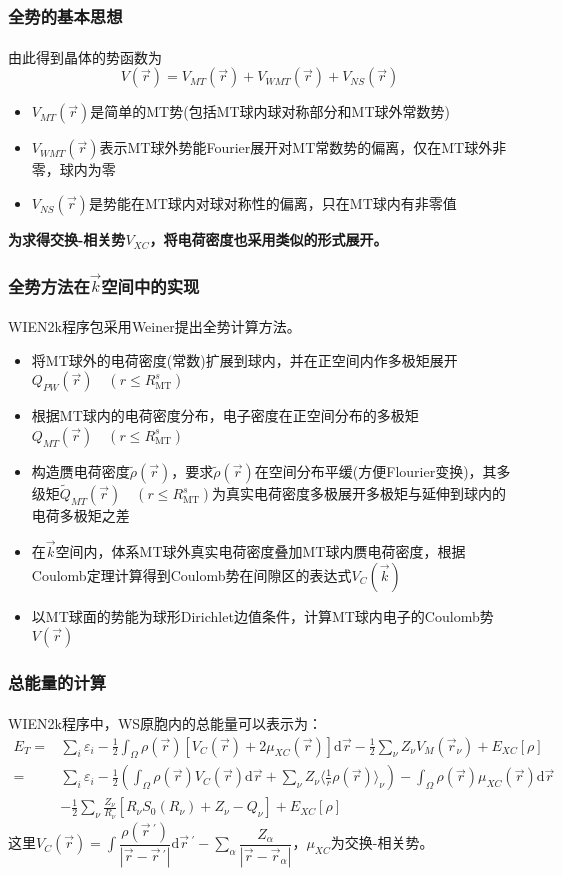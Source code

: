 \documentclass[cjk,slidestop,compress,mathserif,blue]{beamer}
\newcommand{\upcite}[1]{\hspace{0ex}\textsuperscript{\cite{#1}}} %
\begin{document}
\frame
{
\frametitle{全势的基本思想}
由此得到晶体的势函数为\upcite{Comp_Method}
$$ V(\vec r)=V_{MT}(\vec r)+V_{WMT}(\vec r)+V_{NS}(\vec r)
  \label{eq:solid-64}
$$
\begin{itemize}
	\item $V_{MT}(\vec r)$是简单的\textrm{MT}势(包括\textrm{MT}球内球对称部分和\textrm{MT}球外常数势)
	\item $V_{WMT}(\vec r)$表示\textrm{MT}球外势能\textrm{Fourier}展开对\textrm{MT}常数势的偏离，仅在\textrm{MT}球外非零，球内为零
	\item $V_{NS}(\vec r)$是势能在\textrm{MT}球内对球对称性的偏离，只在\textrm{MT}球内有非零值
\end{itemize}
\textbf{\large 为求得交换-相关势$V_{XC}$，将电荷密度也采用类似的形式展开。}
}
\frame
{
\frametitle{全势方法在$\vec k$空间中的实现}
\textrm{WIEN2k}程序包采用\textrm{Weiner}提出全势计算方法\upcite{JMP22-2433_1981}。
\begin{itemize}
	\item 将\textrm{MT}球外的电荷密度(常数)扩展到球内，并在正空间内作多极矩展开$Q_{PW}(\vec r)\quad(r\leqslant R_{\mathrm{MT}}^s)$
	\item 根据\textrm{MT}球内的电荷密度分布，电子密度在正空间分布的多极矩$Q_{MT}(\vec r)\quad(r\leqslant R_{\mathrm{MT}}^s)$
	\item 构造赝电荷密度$\tilde\rho(\vec r)$，要求$\tilde\rho(\vec r)$在空间分布平缓(方便\textrm{Flourier}变换)，其多级矩$\tilde Q_{MT}(\vec r)\quad(r\leqslant R_{\mathrm{MT}}^s)$为真实电荷密度多极展开多极矩与延伸到球内的电荷多极矩之差\\
	\item 在$\vec k$空间内，体系\textrm{MT}球外真实电荷密度叠加\textrm{MT}球内赝电荷密度，根据\textrm{Coulomb}定理计算得到\textrm{Coulomb}势在间隙区的表达式$V_C(\vec k)$
	\item 以\textrm{MT}球面的势能为球形\textrm{Dirichlet}边值条件，计算\textrm{MT}球内电子的\textrm{Coulomb}势$V(\vec r)$
\end{itemize}
}
\frame
{
\frametitle{总能量的计算}
\textrm{WIEN2k}程序中，\textrm{WS}原胞内的总能量可以表示为\upcite{PRB26-4571_1982}：
{\footnotesize
\begin{displaymath}
\begin{split}
E_T=&\sum_i\varepsilon_i-\frac12\int_{\Omega}\rho(\vec r)[V_C(\vec r)+2\mu_{XC}(\vec r)]\mathrm{d}\vec r-\frac12\sum_{\nu}Z_{\nu}V_M(\vec r_{\nu})+E_{XC}[\rho] \\
   =&\sum_i\varepsilon_i-\frac12\left(\int_{\Omega}\rho(\vec r)V_C(\vec r)\mathrm{d}\vec r+\sum_{\nu}Z_{\nu}\bigg\langle\frac1r\rho(\vec r)\bigg\rangle_{\nu}\right)-%
   \int_{\Omega}\rho(\vec r)\mu_{XC}(\vec r)\mathrm{d}\vec r \\
   &-\frac12\sum_{\nu}\frac{Z_{\nu}}{R_{\nu}}[R_{\nu}S_0(R_{\nu})+Z_{\nu}-Q_{\nu}]+E_{XC}[\rho]
\end{split}
\end{displaymath}
}
这里$V_C(\vec r)\!=\!\displaystyle\int\dfrac{\rho(\vec r\,^\prime)}{|\vec r-{\vec r}\,^\prime|}\mathrm{d}\vec r\,^\prime-\sum\limits_{\alpha}\dfrac{Z_{\alpha}}{|\vec r-\vec r_{\alpha}|}$，$\mu_{XC}$为交换-相关势。
}
\end{document}
